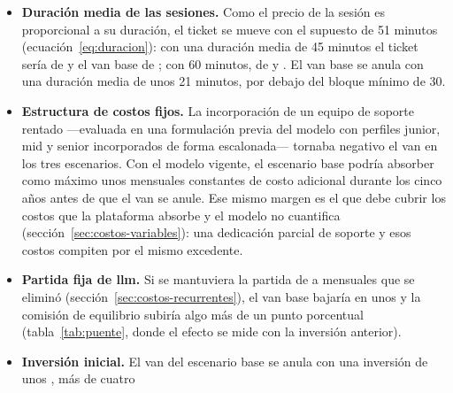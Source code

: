 \begin{itemize}
          el ticket de las clases vendidas en paquete. Si la mitad de las
          sesiones se vendiera en paquetes con el descuento máximo, el
          ticket efectivo bajaría a  y el \gls{van} base a
          ; aun si todas las sesiones se vendieran así, el
          ticket sería de  y el \gls{van} base seguiría siendo
          positivo (). El descuento medio que anula el \gls{van}
          base es de 59,6\,\%, muy por encima del máximo que el sistema admite.
          No se dispone de datos de adopción del paquete, por lo que estas
          cifras son cotas y no una proyección.
    \item \textbf{Duración media de las sesiones.} Como el precio de la
          sesión es proporcional a su duración, el ticket se mueve con el
          supuesto de 51 minutos (ecuación~\ref{eq:duracion}): con una
          duración media de 45 minutos el ticket sería de  y el
          \gls{van} base de ; con 60 minutos, de  y
          . El \gls{van} base se anula con una duración media
          de unos 21 minutos, por debajo del bloque mínimo de 30.
    \item \textbf{Estructura de costos fijos.} La incorporación de un
          equipo de soporte rentado —evaluada en una formulación previa
          del modelo con perfiles junior, mid y senior incorporados de
          forma escalonada— tornaba negativo el \gls{van} en los tres
          escenarios. Con el modelo vigente, el escenario base podría
          absorber como máximo unos  mensuales constantes de
          costo adicional durante los cinco años antes de que el \gls{van}
          se anule. Ese mismo margen es el que debe cubrir los costos que
          la plataforma absorbe y el modelo no cuantifica
          (sección~\ref{sec:costos-variables}): una dedicación parcial de
          soporte y esos costos compiten por el mismo excedente.
    \item \textbf{Partida fija de \gls{llm}.} Si se mantuviera la partida
          de  a  mensuales que se eliminó
          (sección~\ref{sec:costos-recurrentes}), el \gls{van} base
          bajaría en unos  y la comisión de equilibrio subiría
          algo más de un punto porcentual (tabla~\ref{tab:puente}, donde
          el efecto se mide con la inversión anterior).
    \item \textbf{Inversión inicial.} El \gls{van} del escenario base se
          anula con una inversión de unos , más de cuatro

\end{itemize}
